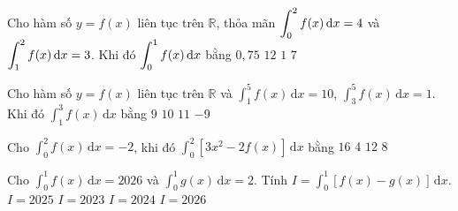 \begin{ex}%
	Cho hàm số $y = f(x)$ liên tục trên $\mathbb{R}$, thỏa mãn $\displaystyle\displaystyle\int_0^2 f(x)\,\mathrm{d}x = 4$ và $\displaystyle\displaystyle\int_1^2 f(x)\,\mathrm{d}x  = 3$. Khi đó $\displaystyle\displaystyle\int_0^1 f(x)\,\mathrm{d}x$ bằng
	\choice 
		 {$0{,}75$}
		 {$12$}
		 {\True $1$}
		 {$7$}
\end{ex}

\begin{ex}%
	Cho hàm số $ y=f(x)$ liên tục trên $\mathbb{R}$ và $\displaystyle\int_1^5{f(x)}\mathrm{\,d}x=10$, $\displaystyle\int_3^5{f(x)}\mathrm{\,d}x=1$. Khi đó $\displaystyle\int_1^3{f(x)}\mathrm{\,d}x$  bằng
	\choice 
		 {\True $9$}
		 {$10$}
		 {$11$}
		 {$-9$}
\end{ex}

\begin{ex}%
	Cho $\displaystyle\int_{0}^{2}f(x)\mathrm{\,d}{x}=-2$, khi  đó $\displaystyle\int_{0}^{2}\left[3x^2-2f(x)\right]\mathrm{\,d}{x}$ bằng
	\choice 
		 {$16$}
		 {$4$}
		{\True  $12$}
		{$8$} 
\end{ex}

\begin{ex}%
	Cho $\displaystyle\int_0^1f(x)\mathrm{\,d}x=2026$ và $\displaystyle\int_0^1g(x)\mathrm{\,d}x=2$. Tính  $I=\displaystyle\int_0^1\left[f(x)-g(x)\right]\mathrm{\,d}x$.
	 \choice
		{$I=2025$} 
		{$I=2023$} 
		 {\True $I=2024$}
		{$I=2026$} 
\end{ex}


